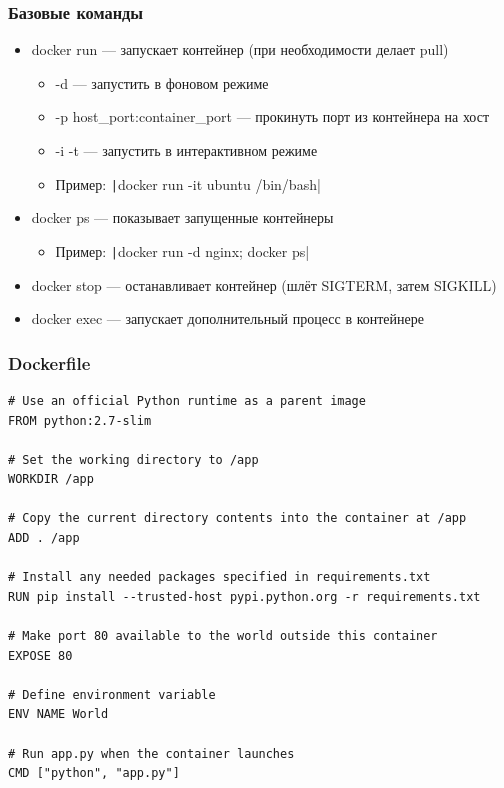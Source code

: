 \documentclass{../../slides-style}
\begin{document}
    \begin{frame}
        \frametitle{Базовые команды}
        \begin{itemize}
            \item docker run --- запускает контейнер (при необходимости делает pull)
            \begin{itemize}
                \item -d --- запустить в фоновом режиме
                \item -p host\_port:container\_port --- прокинуть порт из контейнера на хост
                \item -i -t --- запустить в интерактивном режиме
                \item Пример: \texttt|docker run -it ubuntu /bin/bash|
            \end{itemize}
            \item docker ps --- показывает запущенные контейнеры
            \begin{itemize}
                \item Пример: \texttt|docker run -d nginx; docker ps|
            \end{itemize}
            \item docker stop --- останавливает контейнер (шлёт SIGTERM, затем SIGKILL)
            \item docker exec --- запускает дополнительный процесс в контейнере
        \end{itemize}
    \end{frame}

    \begin{frame}[fragile]
        \frametitle{Dockerfile}
        \begin{scriptsize}
            \begin{verbatim}
# Use an official Python runtime as a parent image
FROM python:2.7-slim

# Set the working directory to /app
WORKDIR /app

# Copy the current directory contents into the container at /app
ADD . /app

# Install any needed packages specified in requirements.txt
RUN pip install --trusted-host pypi.python.org -r requirements.txt

# Make port 80 available to the world outside this container
EXPOSE 80

# Define environment variable
ENV NAME World

# Run app.py when the container launches
CMD ["python", "app.py"]
            \end{verbatim}
        \end{scriptsize}
    \end{frame}
\end{document}
